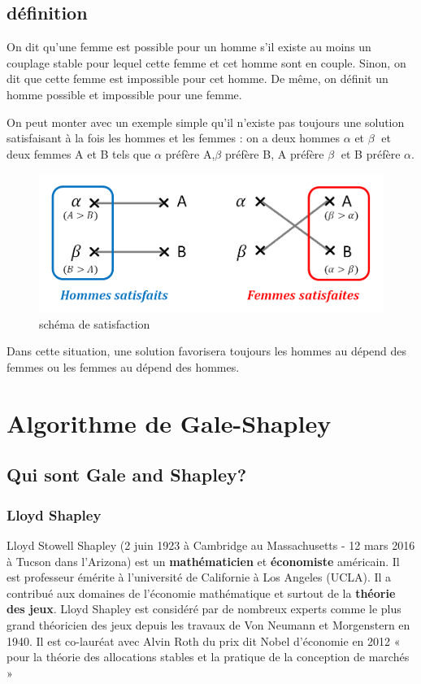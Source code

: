  	\subsection{définition}
 		\par On dit qu’une femme est possible pour un homme s’il existe au moins un couplage stable pour lequel cette femme et cet homme sont en couple. Sinon, on dit que cette femme est impossible pour cet homme.
De même, on définit un homme possible et impossible pour une femme.
\par On peut monter avec un exemple simple qu’il n’existe pas toujours une solution satisfaisant à la fois les hommes et les femmes : on a deux hommes  $ \alpha $ et $\beta$ et deux femmes A et B tels que $\alpha$ préfère A,$\beta$ préfère B, A préfère $\beta$ et B préfère $\alpha$.	
 \begin{figure}[h!]
	\center
	\includegraphics[scale=0.6]{img/def.png}
	\caption{schéma de satisfaction}
	
\end{figure}

\par Dans cette situation, une solution favorisera toujours les hommes au dépend des femmes ou les femmes au dépend des hommes.	
\cite{def}
\section{Algorithme de Gale-Shapley }
\subsection{Qui sont Gale and Shapley?}
\subsubsection{Lloyd Shapley} Lloyd Stowell Shapley (2 juin 1923 à Cambridge au Massachusetts - 12 mars 2016 à Tucson dans l'Arizona) est un \textbf{mathématicien} et \textbf{économiste} américain. Il est professeur émérite à l’université de Californie à Los Angeles (UCLA). Il a contribué aux domaines de l’économie mathématique et surtout de la \textbf{théorie des jeux}. Lloyd Shapley est considéré par de nombreux experts comme le plus grand théoricien des jeux depuis les travaux de Von Neumann et Morgenstern en 1940. Il est co-lauréat avec Alvin Roth du prix dit Nobel d'économie en 2012 « pour la théorie des allocations stables et la pratique de la conception de marchés » \cite{Shapley}
